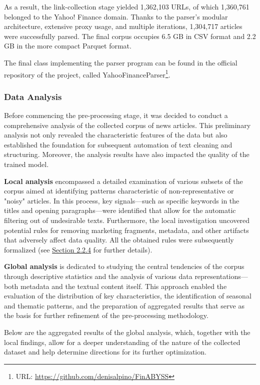 As a result, the link-collection stage yielded 1,362,103 URLs, of which 1,360,761 belonged to the Yahoo! Finance domain.
Thanks to the parser's modular architecture, extensive proxy usage, and multiple iterations, 1,304,717 articles were
successfully parsed. The final corpus occupies 6.5 GB in CSV format and 2.2 GB in the more compact Parquet format.

The final class implementing the parser program can be found in the official repository of the project, called
YahooFinanceParser\footnote{URL: \url{https://github.com/denisalpino/FinABYSS}}.

\subsubsection{Data Analysis}
\label{sec:data_analysis}
Before commencing the pre-processing stage, it was decided to conduct a comprehensive analysis of the collected corpus of news articles.
This preliminary analysis not only revealed the characteristic features of the data but also established the foundation for subsequent
automation of text cleaning and structuring. Moreover, the analysis results have also impacted the quality of the trained model.

\textbf{Local analysis} encompassed a detailed examination of various subsets of the corpus aimed at identifying patterns characteristic
of non-representative or "noisy" articles. In this process, key signals—such as specific keywords in the titles and opening paragraphs—were
identified that allow for the automatic filtering out of undesirable texts. Furthermore, the local investigation uncovered potential
rules for removing marketing fragments, metadata, and other artifacts that adversely affect data quality.
All the obtained rules were subsequently formalized (see \hyperref[sec:data_prep]{Section 2.2.4} for further details).

\textbf{Global analysis} is dedicated to studying the central tendencies of the corpus through descriptive statistics and the analysis
of various data representations—both metadata and the textual content itself. This approach enabled the evaluation of the distribution
of key characteristics, the identification of seasonal and thematic patterns, and the preparation of aggregated results that serve
as the basis for further refinement of the pre-processing methodology.

Below are the aggregated results of the global analysis, which, together with the local findings, allow for a deeper understanding
of the nature of the collected dataset and help determine directions for its further optimization.

